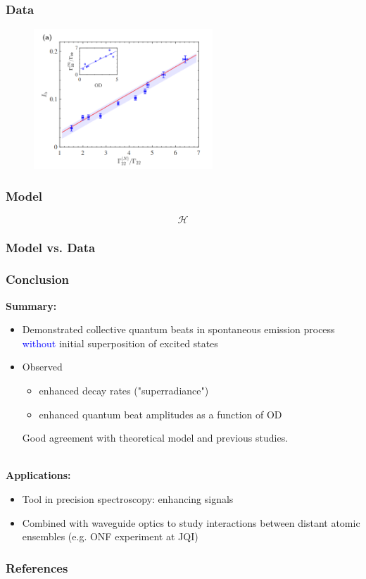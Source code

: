 \documentclass{beamer}
\theoremstyle{definition}
\begin{document}
\begin{frame}
	\frametitle{Data}
	
	\begin{figure}[!htb]
		\centering
		\includegraphics[width=0.6\textwidth]{data_Ib.png}
	\end{figure}
\end{frame}


\begin{frame}
	\frametitle{Model}
	
	\begin{equation*}
	\mathcal{H}
	\end{equation*}
\end{frame}


\begin{frame}
	\frametitle{Model vs. Data}
\end{frame}



\begin{frame}
	
	\frametitle{Conclusion}
	\textbf{Summary:}
	
	\begin{itemize}
		\item Demonstrated collective quantum beats in spontaneous emission process \textcolor{blue}{without} initial superposition of excited states
		
		\item Observed 
		\begin{itemize}
			\item enhanced decay rates ("superradiance")
			\item enhanced quantum beat amplitudes as a function of OD
		\end{itemize}
		Good agreement with theoretical model and previous studies.

	\end{itemize}


	$\,$\\
	\textbf{Applications:}
	\begin{itemize}
		\item Tool in precision spectroscopy: enhancing signals
		
		\item Combined with waveguide optics to study interactions between distant atomic ensembles (e.g. ONF experiment at JQI)
	\end{itemize}
\end{frame}



\begin{frame}
\frametitle{References}

{}
\end{frame}
\end{document}
